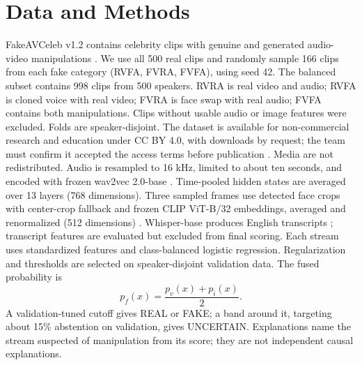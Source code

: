 \documentclass[conference]{IEEEtran}
\begin{document}
\section{Data and Methods}
FakeAVCeleb v1.2 contains celebrity clips with genuine and generated audio-video manipulations \cite{khalid}. We use all 500 real clips and randomly sample 166 clips from each fake category (RVFA, FVRA, FVFA), using seed 42. The balanced subset contains 998 clips from 500 speakers. RVRA is real video and audio; RVFA is cloned voice with real video; FVRA is face swap with real audio; FVFA contains both manipulations. Clips without usable audio or image features were excluded. Folds are speaker-disjoint. The dataset is available for non-commercial research and education under CC BY 4.0, with downloads by request; the team must confirm it accepted the access terms before publication \cite{fakeavlicense}. Media are not redistributed.
Audio is resampled to 16 kHz, limited to about ten seconds, and encoded with frozen wav2vec 2.0-base \cite{baevski}. Time-pooled hidden states are averaged over 13 layers (768 dimensions). Three sampled frames use detected face crops with center-crop fallback and frozen CLIP ViT-B/32 embeddings, averaged and renormalized (512 dimensions) \cite{radfordclip}. Whisper-base produces English transcripts \cite{radfordwhisper}; transcript features are evaluated but excluded from final scoring.
Each stream uses standardized features and class-balanced logistic regression. Regularization and thresholds are selected on speaker-disjoint validation data. The fused probability is
\begin{equation}p_f(x)=\frac{p_v(x)+p_i(x)}{2}.\end{equation}
A validation-tuned cutoff gives REAL or FAKE; a band around it, targeting about 15\% abstention on validation, gives UNCERTAIN. Explanations name the stream suspected of manipulation from its score; they are not independent causal explanations.
\end{document}
